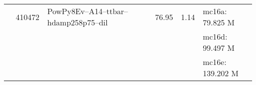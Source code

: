 \begin{center}
	\label{tab:mc_bkg_nom}
	\tablelasttail{\bottomrule}
	{
		\scriptsize
		\begin{xtabular}{lclS[round-mode=figures, round-precision=3]S[round-mode=places,  round-precision=2]l}
			
			\ttbar  & 410472 & PowPy8Ev--A14--ttbar--hdamp258p75--dil        & 76.95      & 1.14 & mc16a: 79.825 M   \\
			& & & & & mc16d:   99.497 M \\
			& & & & & mc16e: 139.202 M \\
			

\end{xtabular}}
\end{center}
